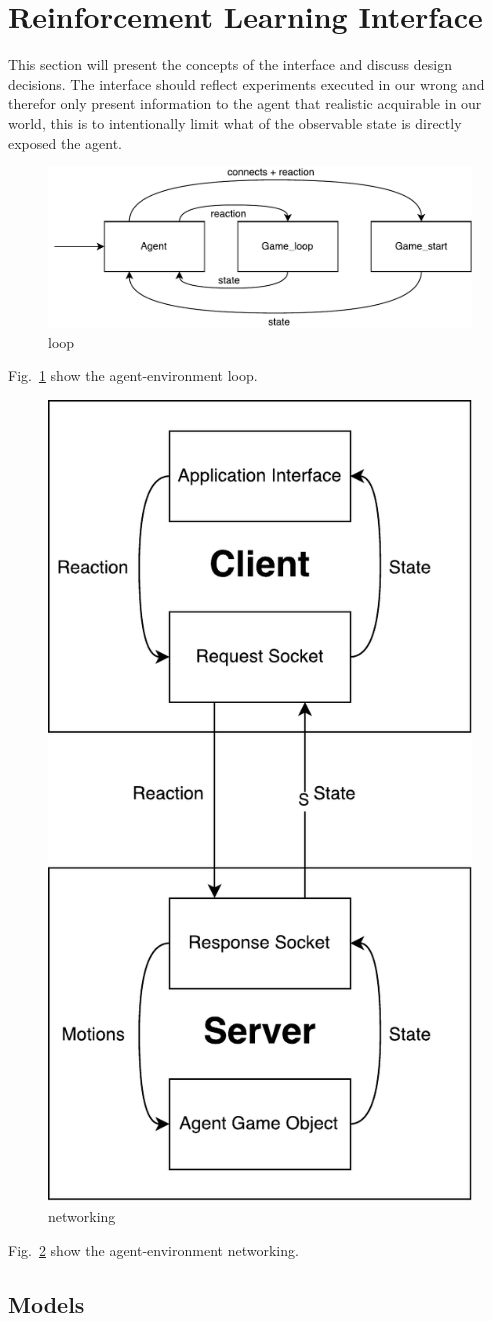\section{Reinforcement Learning Interface}\label{sec:learning}

This section will present the concepts of the interface and discuss design decisions.
The interface should reflect experiments executed in our wrong and therefor only present information to the agent that realistic acquirable in our world, this is to intentionally limit what of the observable state is directly exposed the agent.

\begin{figure}
\centering
\includegraphics[width=.6\linewidth]{figures/neodroid_agent_game.pdf}
\caption{loop}
\label{fig:loop}
\end{figure}

Fig.~\ref{fig:loop} show the agent-environment loop.

\begin{figure}
\centering
\includegraphics[width=.3\linewidth]{figures/networking.pdf}
\caption{networking}
\label{fig:networking}
\end{figure}

Fig.~\ref{fig:networking} show the agent-environment networking.


\subsection{Models}

